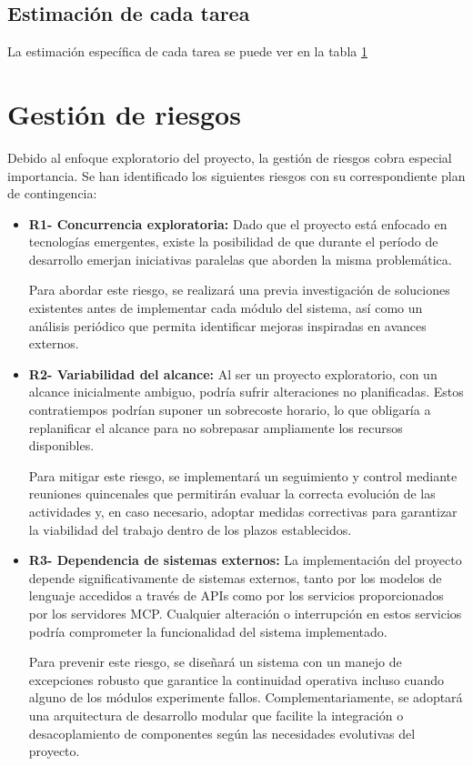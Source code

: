 \subsection{Estimación de cada tarea}
La estimación específica de cada tarea se puede ver en la tabla \ref{}

\section{Gestión de riesgos}

Debido al enfoque exploratorio del proyecto, la gestión de riesgos cobra especial importancia. Se han identificado los siguientes riesgos con su correspondiente plan de contingencia: 

\begin{itemize}
  \item\textbf{R1- Concurrencia exploratoria: }Dado que el proyecto está enfocado en tecnologías emergentes, existe la posibilidad de que durante el período de desarrollo emerjan iniciativas paralelas que aborden la misma problemática.  

Para abordar este riesgo, se realizará una previa investigación de soluciones existentes antes de implementar cada módulo del sistema, así como un análisis periódico que permita identificar mejoras inspiradas en avances externos.

\item\textbf{R2- Variabilidad del alcance: }Al ser un proyecto exploratorio, con un alcance inicialmente ambiguo, podría sufrir alteraciones no planificadas. Estos contratiempos podrían suponer un sobrecoste horario, lo que obligaría a replanificar el alcance para no sobrepasar ampliamente los recursos disponibles.

Para mitigar este riesgo, se implementará un seguimiento y control mediante reuniones quincenales que permitirán evaluar la correcta evolución de las actividades y, en caso necesario, adoptar medidas correctivas para garantizar la viabilidad del trabajo dentro de los plazos establecidos.


\item\textbf{R3- Dependencia de sistemas externos: }La implementación del proyecto depende significativamente de sistemas externos, tanto por los modelos de lenguaje accedidos a través de APIs como por los servicios proporcionados por los servidores MCP. Cualquier alteración o interrupción en estos servicios podría comprometer la funcionalidad del sistema implementado.

Para prevenir este riesgo, se diseñará un sistema con un manejo de excepciones robusto que garantice la continuidad operativa incluso cuando alguno de los módulos experimente fallos. Complementariamente, se adoptará una arquitectura de desarrollo modular que facilite la integración o desacoplamiento de componentes según las necesidades evolutivas del proyecto.


\end{itemize}
